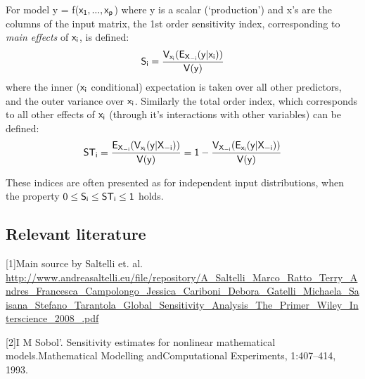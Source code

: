 \documentclass[]{article}
\begin{document}
For model y = f(\(\sf{x_{1}},..., x_{p}\)) where y is a scalar
(`production') and x's are the columns of the input matrix, the 1st
order sensitivity index, corresponding to \emph{main effects} of
\(\sf{x_{i}}\), is defined:
\[\sf{S_{i}}=\dfrac{V_{x_{i}}(E_{X_{-i}}(y|x_{i}))}{V(y)}\] where the
inner (\(\sf{x_{i}}\) conditional) expectation is taken over all other
predictors, and the outer variance over \(\sf{x_{i}}\). Similarly the
total order index, which corresponds to all other effects of
\(\sf{x_{i}}\) (through it's interactions with other variables) can be
defined:
\[\sf{ST_{i}}=\dfrac{E_{X_{-i}}(V_{x_{i}}(y|X_{-i}))}{V(y)}=1-\dfrac{V_{X_{-i}}(E_{x_{i}}(y|X_{-i}))}{V(y)}\]

These indices are often presented as for independent input
distributions, when the property \(0\leq\sf{S_{i}}\leq\sf{ST_{i}}\leq1\)
holds.

\subsection{Relevant literature}\label{relevant-literature}

{[}1{]}Main source by Saltelli et. al.
\url{http://www.andreasaltelli.eu/file/repository/A_Saltelli_Marco_Ratto_Terry_Andres_Francesca_Campolongo_Jessica_Cariboni_Debora_Gatelli_Michaela_Saisana_Stefano_Tarantola_Global_Sensitivity_Analysis_The_Primer_Wiley_Interscience_2008_.pdf}

{[}2{]}I M Sobol'. Sensitivity estimates for nonlinear mathematical
models.Mathematical Modelling andComputational Experiments, 1:407--414,
1993.
\end{document}
